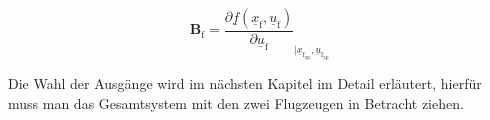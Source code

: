\begin{equation}
\textbf{B}_\mathrm{f} = \dfrac{\partial \underline{f}(\underline{x}_\mathrm{f},\underline{u}_\mathrm{f})}{\partial \underline{u}_\mathrm{f}}_{|\underline{x}_\mathrm{f_{ap}},\underline{u}_\mathrm{f_{ap}}} 
\end{equation}

Die Wahl der Ausgänge wird im nächsten Kapitel im Detail erläutert, hierfür muss man das Gesamtsystem mit den zwei Flugzeugen in Betracht ziehen.
